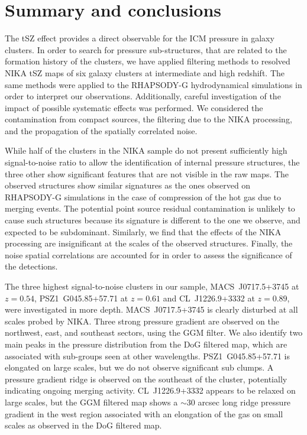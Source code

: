 \documentclass[twocolumn,traditabstract]{aa}
\begin{document}
\section{Summary and conclusions}\label{sec:Summary_and_conclusions}
The tSZ effect provides a direct observable for the ICM pressure in galaxy clusters. In order to search for pressure sub-structures, that are related to the formation history of the clusters, we have applied filtering methods to resolved NIKA tSZ maps of six galaxy clusters at intermediate and high redshift. The same methods were applied to the RHAPSODY-G hydrodynamical simulations in order to interpret our observations. Additionally, careful investigation of the impact of possible systematic effects was performed. We considered the contamination from compact sources, the filtering due to the NIKA processing, and the propagation of the spatially correlated noise.

While half of the clusters in the NIKA sample do not present sufficiently high signal-to-noise ratio to allow the identification of internal pressure structures, the three other show significant features that are not visible in the raw maps. The observed structures show similar signatures as the ones observed on RHAPSODY-G simulations in the case of compression of the hot gas due to merging events. The potential point source residual contamination is unlikely to cause such structures because its signature is different to the one we observe, and expected to be subdominant. Similarly, we find that the effects of the NIKA processing are insignificant at the scales of the observed structures. Finally, the noise spatial correlations are accounted for in order to assess the significance of the detections.

The three highest signal-to-noise clusters in our sample, \mbox{MACS~J0717.5+3745} at $z=0.54$, \mbox{PSZ1~G045.85+57.71} at $z=0.61$ and \mbox{CL~J1226.9+3332} at $z=0.89$, were investigated in more depth. \mbox{MACS~J0717.5+3745} is clearly disturbed at all scales probed by NIKA. Three strong pressure gradient are observed on the northwest, east, and southeast sectors, using the GGM filter. We also identify two main peaks in the pressure distribution from the DoG filtered map, which are associated with sub-groups seen at other wavelengths. \mbox{PSZ1~G045.85+57.71} is elongated on large scales, but we do not observe significant sub clumps. A pressure gradient ridge is observed on the southeast of the cluster, potentially indicating ongoing merging activity. \mbox{CL~J1226.9+3332} appears to be relaxed on large scales, but the GGM filtered map shows a $\sim 30$ arcsec long ridge pressure gradient in the west region associated with an elongation of the gas on small scales as observed in the DoG filtered map.
\end{document}
